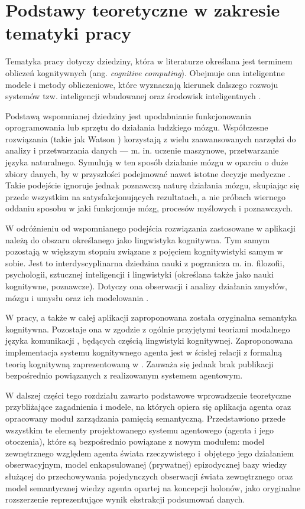 \chapter{Podstawy teoretyczne w zakresie tematyki pracy}

Tematyka pracy dotyczy dziedziny, która w literaturze określana jest terminem obliczeń kognitywnych (ang. \textit{cognitive computing}). Obejmuje ona inteligentne modele i metody obliczeniowe, które wyznaczają kierunek dalszego rozwoju systemów tzw. inteligencji wbudowanej oraz środowisk inteligentnych \cite{hur15}.

Podstawą wspomnianej dziedziny jest upodabnianie funkcjonowania oprogramowania lub sprzętu do działania ludzkiego mózgu. Współczesne rozwiązania (takie jak  Watson \cite{kel13}) korzystają z wielu zaawansowanych narzędzi do analizy i przetwarzania danych --- m. in. uczenie maszynowe, przetwarzanie języka naturalnego. Symulują w ten sposób działanie mózgu w oparciu o duże zbiory danych, by w przyszłości podejmować nawet istotne decyzje medyczne \cite{woo15}. Takie podejście ignoruje jednak poznawczą naturę działania mózgu, skupiając się przede wszystkim na satysfakcjonujących rezultatach, a nie próbach wiernego oddaniu sposobu w jaki funkcjonuje mózg, procesów myślowych i poznawczych.

W odróżnieniu od wspomnianego podejścia rozwiązania zastosowane w aplikacji należą do obszaru określanego jako lingwistyka kognitywna. Tym samym pozostają w większym stopniu związane z pojęciem kognitywistyki samym w sobie. Jest to interdyscyplinarna dziedzina nauki z pogranicza m. in. filozofii, psychologii, sztucznej inteligencji i lingwistyki (określana także jako nauki kognitywne, poznawcze). Dotyczy ona obserwacji i analizy działania zmysłów, mózgu i umysłu oraz ich modelowania \cite{tha17}.

W pracy, a także w całej aplikacji zaproponowana została oryginalna semantyka kognitywna. Pozostaje ona w zgodzie z ogólnie przyjętymi teoriami modalnego języka komunikacji \cite{tal00}, będących częścią lingwistyki kognitywnej. Zaproponowana implementacja systemu kognitywnego agenta jest w ścisłej relacji z formalną teorią kognitywną zaprezentowaną w \cite{kat07}. Zauważa się jednak brak publikacji bezpośrednio powiązanych z realizowanym systemem agentowym.

W dalszej części tego rozdziału zawarto podstawowe wprowadzenie teoretyczne przybliżające zagadnienia i modele, na których opiera się aplikacja agenta oraz opracowany moduł zarządzania pamięcią semantyczną. Przedstawiono przede wszystkim te elementy projektowanego systemu agentowego (agenta i jego otoczenia), które są bezpośrednio powiązane z nowym modułem: model zewnętrznego względem agenta świata rzeczywistego i~objętego jego działaniem obserwacyjnym, model enkapsulowanej (prywatnej) epizodycznej bazy wiedzy służącej do przechowywania pojedynczych obserwacji świata zewnętrznego oraz model semantycznej wiedzy agenta opartej na koncepcji holonów, jako oryginalne rozszerzenie reprezentujące wynik ekstrakcji podsumowań danych.

